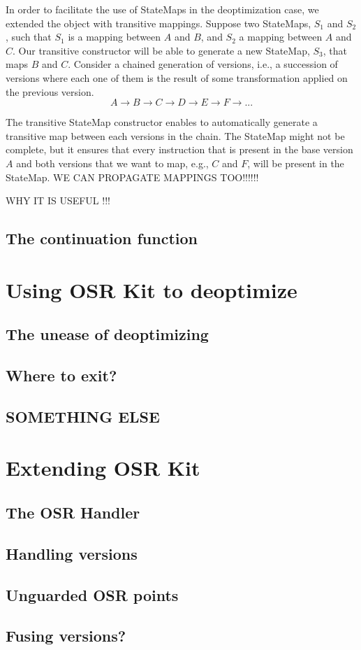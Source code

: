 In order to facilitate the use of StateMaps in the deoptimization case, we extended the object with transitive mappings.
Suppose two StateMaps, $S_1$ and $S_2$, such that $S_1$ is a mapping between $A$ and $B$, and $S_2$ a mapping between $A$ and $C$.
Our transitive constructor will be able to generate a new StateMap, $S_3$, that maps $B$ and $C$.
Consider a chained generation of versions, i.e., a succession of versions where each one of them is the result of some transformation applied on the previous version.
$$A \rightarrow B \rightarrow C \rightarrow D \rightarrow E \rightarrow F \rightarrow ...$$

The transitive StateMap constructor enables to automatically generate a transitive map between each versions in the chain.
The StateMap might not be complete, but it ensures that every instruction that is present in the base version $A$ and both versions that we want to map, e.g., $C$ and $F$, will be present in the StateMap.
WE CAN PROPAGATE MAPPINGS TOO!!!!!!


WHY IT IS USEFUL !!!

\subsection{The continuation function}\label{thecontinuationfunction}

\section{Using OSR Kit to deoptimize}\label{osrForUs}
\subsection{The unease of deoptimizing}
\subsection{Where to exit?}
\subsection{SOMETHING ELSE}

\section{Extending OSR Kit}\label{extendingOSR}
\subsection{The OSR Handler}
\subsection{Handling versions}
\subsection{Unguarded OSR points}
\subsection{Fusing versions?}
